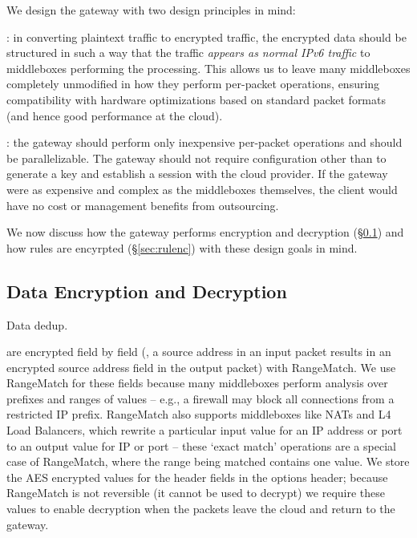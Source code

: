 We design the gateway with two design principles in mind: 

: in converting plaintext traffic to encrypted traffic, the encrypted data should be structured in such a way that the traffic {\it appears as normal IPv6 traffic} to middleboxes performing the processing. This allows us to leave many middleboxes completely unmodified in how they perform per-packet operations, ensuring compatibility with hardware optimizations based on standard packet formats (and hence good performance at the cloud). 

: the gateway should perform only inexpensive per-packet operations and should be parallelizable. The gateway should not require configuration other than to generate a key and establish a session with the cloud provider. If the gateway were as expensive and complex as the middleboxes themselves, the client would have no cost or management benefits from outsourcing. 

We now discuss how the gateway performs encryption and decryption (\S\ref{sec:dataenc}) and how rules are encyrpted (\S\ref{sec:rulenc}) with these design goals in mind.

\subsection{Data Encryption and Decryption}
\label{sec:dataenc}
Data dedup.

 are encrypted field by field (\eg{}, a source address in an input packet results in an encrypted source address field in the output packet) with RangeMatch.
We use RangeMatch for these fields because many middleboxes perform analysis over prefixes and ranges of values -- e.g., a firewall may block all connections from a restricted IP prefix.
RangeMatch also supports middleboxes like NATs and L4 Load Balancers, which rewrite a particular input value for an IP address or port to an output value for IP or port -- these `exact match' operations are a special case of RangeMatch, where the range being matched contains one value.
We store the AES encrypted values for the header fields in the options header; because RangeMatch is not reversible (it cannot be used to decrypt) we require these values to enable decryption when the packets leave the cloud and return to the gateway.

